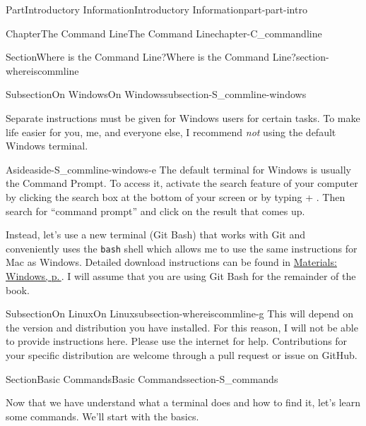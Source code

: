 \documentclass[twoside,10pt,]{book}
\newcommand{\mono}[1]{\texttt{#1}}
\newcommand{\kbd}[1]{\keys{{#1}}}
\begin{document}
\begin{partptx}{Part}{Introductory Information}{}{Introductory Information}{}{}{part-part-intro}
\begin{chapterptx}{Chapter}{The Command Line}{}{The Command Line}{}{}{chapter-C_commandline}
\begin{sectionptx}{Section}{Where is the Command Line?}{}{Where is the Command Line?}{}{}{section-whereiscommline}
\begin{subsectionptx}{Subsection}{On Windows}{}{On Windows}{}{}{subsection-S_commline-windows}
\par
Separate instructions must be given for Windows users for certain tasks. To make life easier for you, me, and everyone else, I recommend \emph{not} using the default Windows terminal.%
\begin{aside}{Aside}{}{aside-S_commline-windows-e}%
The default terminal for Windows is usually the Command Prompt. To access it, activate the search feature of your computer by clicking the search box at the bottom of your screen or by typing \kbd{Windows} + \kbd{S}. Then search for ``command prompt'' and click on the result that comes up.%
\end{aside}
Instead, let's use a new terminal (Git Bash) that works with Git and conveniently uses the \mono{bash} shell which allows me to use the same instructions for Mac as Windows. Detailed download instructions can be found in \hyperref[preface-materials-windows]{Materials: Windows, p.\,\pageref{preface-materials-windows}}. I will assume that you are using Git Bash for the remainder of the book.%
\end{subsectionptx}
%
%
\typeout{************************************************}
\typeout{************************************************}
%
\begin{subsectionptx}{Subsection}{On Linux}{}{On Linux}{}{}{subsection-whereiscommline-g}
%
This will depend on the version and distribution you have installed. For this reason, I will not be able to provide instructions here. Please use the internet for help. Contributions for your specific distribution are welcome through a pull request or issue on GitHub.%
\end{subsectionptx}
\end{sectionptx}
%
%
\typeout{************************************************}
\typeout{************************************************}
%
\begin{sectionptx}{Section}{Basic Commands}{}{Basic Commands}{}{}{section-S_commands}
%
%
%
\begin{introduction}{}%
Now that we have understand what a terminal does and how to find it, let's learn some commands. We'll start with the basics.%
\end{introduction}%
%
%
\typeout{************************************************}
\typeout{************************************************}

\end{sectionptx}
\end{chapterptx}
\end{partptx}
\end{document}
